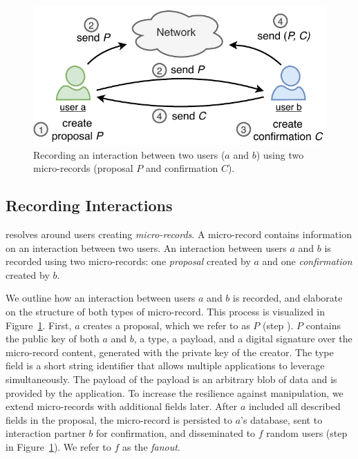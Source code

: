 \begin{figure}[t]
	\centering
	\includegraphics[width=\linewidth]{trustchain/assets/interaction}
	\caption{Recording an interaction between two users ($ a $ and $ b $) using two micro-records (proposal $ P $ and confirmation $ C $).}
	\label{fig:interaction}
\end{figure}

\subsection{Recording Interactions}
\label{sec:recording_interactions}
\ModelName{} resolves around users creating \emph{micro-records}.
A micro-record contains information on an interaction between two users.
An interaction between users $ a $ and $ b $ is recorded using two micro-records: one \emph{proposal} created by $ a $ and one \emph{confirmation} created by $ b $.

We outline how an interaction between users $ a $ and $ b $ is recorded, and elaborate on the structure of both types of micro-record.
This process is visualized in Figure~\ref{fig:interaction}.
First, $ a $ creates a proposal, which we refer to as $ P $ (step ).
$ P $ contains the public key of both $ a $ and $ b $, a type, a payload, and a digital signature over the micro-record content, generated with the private key of the creator.
The type field is a short string identifier that allows multiple applications to leverage \ModelName{} simultaneously.
The payload of the payload is an arbitrary blob of data and is provided by the application.
To increase the resilience against manipulation, we extend micro-records with additional fields later.
After $ a $ included all described fields in the proposal, the micro-record is persisted to $ a $'s database, sent to interaction partner $ b $ for confirmation, and disseminated to $ f $ random users (step  in Figure~\ref{fig:interaction}).
We refer to $ f $ as the \emph{fanout}.

